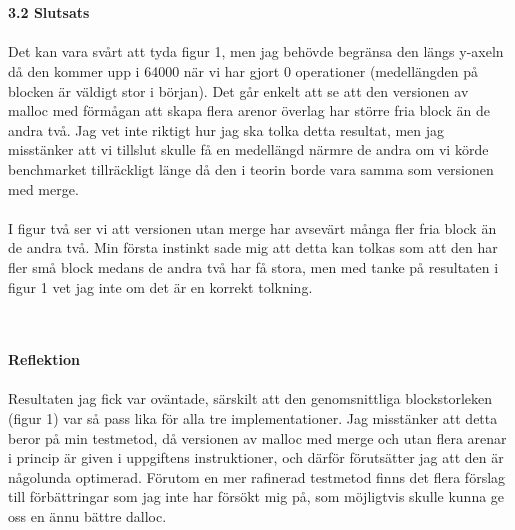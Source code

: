 \documentclass[a4paper,10pt]{article}
\begin{document}
    
\maketitle
\textbf
    {\\\\3.2 Slutsats\\\\}
    Det kan vara svårt att tyda figur 1, men jag behövde begränsa den längs y-axeln då den kommer upp i 64000 när vi har gjort 0 operationer (medellängden på blocken är väldigt stor i början). Det går enkelt att se att den versionen av malloc med förmågan att skapa flera arenor överlag har större fria block än de andra två. Jag vet inte riktigt hur jag ska tolka detta resultat, men jag misstänker att vi tillslut skulle få en medellängd närmre de andra om vi körde benchmarket tillräckligt länge då den i teorin borde vara samma som versionen med merge. \\\\

I figur två ser vi att versionen utan merge har avsevärt många fler fria block än de andra två. Min första instinkt sade mig att detta kan tolkas som att den har fler små block medans de andra två har få stora, men med tanke på resultaten i figur 1 vet jag inte om det är en korrekt tolkning.

\maketitle
\textbf
    {\\\\Reflektion\\\\}
    Resultaten jag fick var oväntade, särskilt att den genomsnittliga blockstorleken (figur 1) var så pass lika för alla tre implementationer. Jag misstänker att detta beror på min testmetod, då versionen av malloc med merge och utan flera arenar i princip är given i uppgiftens instruktioner, och därför förutsätter jag att den är någolunda optimerad. Förutom en mer rafinerad testmetod finns det flera förslag till förbättringar som jag inte har försökt mig på, som möjligtvis skulle kunna ge oss en ännu bättre dalloc. 
\end{document}
